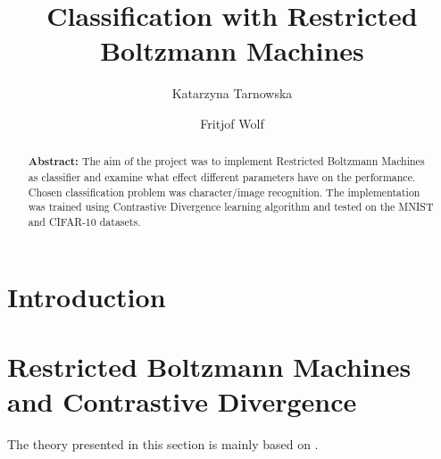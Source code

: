 \documentclass[a4paper]{scrartcl}
\begin{document}
\title{Classification with Restricted Boltzmann Machines}
\author{Katarzyna Tarnowska \and Fritjof Wolf}
\maketitle

\begin{abstract}
\textbf{Abstract:}
The aim of the project was to implement Restricted Boltzmann Machines as classifier and examine what effect different parameters have on the performance. Chosen classification problem was character/image recognition. The implementation was trained using Contrastive Divergence learning algorithm and tested on the MNIST and CIFAR-10 datasets. 
\end{abstract}
\newpage

\section{Introduction}

\newpage

\section{Restricted Boltzmann Machines and Contrastive Divergence}
The theory presented in this section is mainly based on \cite{Hinton}.
\end{document}
